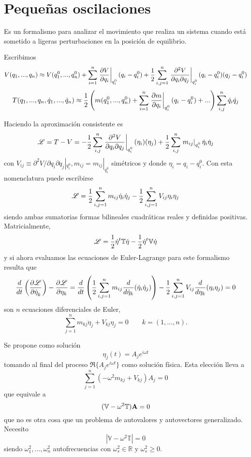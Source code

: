 \documentclass[10pt,oneside]{CBFT_book}
\begin{document}
\chapter{Pequeñas oscilaciones}

Es un formalismo para analizar el movimiento que realiza un sistema cuando está sometido a
ligeras perturbaciones en la posición de equilibrio.

Escribimos
\[
	V(q_1,...,q_n) \approx V(q_1^0,...,q_n^0) + \sum_{i=1}^n \left. \dpar{V}{q_i} \right|_{q_i^0} (q_i - q_i^0)
		+ \frac{1}{2} \sum_{i,j=1}^n \left. \dparcru{V}{q_j}{q_i}\right|_{q_i^0}(q_i -q_i^0)(q_j -q_i^0)
\]
\[
	T(q_1,...,q_n,\dot{q}_1,...,\dot{q}_n) \approx \frac{1}{2} \left( m(q_1^0,...,q_n^0) + \sum_{i=1}^n 
				\left. \dpar{m}{q_i} \right|_{q_i^0} (q_i - q_i^0) + ... \right) \sum_{i,j}^n \dot{q}_i\dot{q}_j
\]

Haciendo la aproximación consistente es
\[
	\Lag = T - V = - \frac{1}{2} \sum_{i,j}^n \left. \dparcru{V}{q_j}{q_i}\right|_{q_i^0}(\eta_i)(\eta_j) +
		\frac{1}{2} \sum_{i,j}^n \left. m_{ij}\right|_{q_i^0} \dot{\eta}_i \dot{\eta}_j
\]
con $V_{ij} \equiv \partial^2 V/ \partial q_i \partial q_j |_{q_i^0} , m_{ij} = m_{ij}|_{q_i^0}$ simétricos 
y donde $\eta_i = q_i - q_i^0$. Con esta nomenclatura puede escribirse
\[
	\Lag = \frac{1}{2} \sum_{i,j=1}^n m_{ij} \dot{\eta}_i \dot{\eta}_j - \frac{1}{2} \sum_{i,j=1}^n V_{ij} \eta_i \eta_j
\]
siendo ambas sumatorias formas bilineales cuadráticas reales y definidas positivas. Matricialmente,
\[
	\Lag = \frac{1}{2} \dot{\vb{\eta}}^t \mathbb{T} \dot{\vb{\eta}} - \frac{1}{2} \dot{\vb{\eta}}^t \mathbb{V} \dot{\vb{\eta}}
\]
y si ahora evaluamos las ecuaciones de Euler-Lagrange para este formalismo resulta que 
\[
	\frac{d}{dt}\left( \dpar{\Lag}{\dot{\eta}_k} \right) - \dpar{\Lag}{\eta_k} = 
		\frac{d}{dt} \left( \frac{1}{2} \sum_{i,j=1}^n m_{ij} \frac{d}{d\dot{\eta}_k}(\dot{\eta}_i \dot{\eta}_j) \right) - 
		\frac{1}{2} \sum_{i,j=1}^n V_{ij} \frac{d}{d\eta_k} (\eta_i \eta_j) = 0
\]
son $n$ ecuaciones diferenciales de Euler, 
\[
	\sum_{j=1}^n m_{kj} \ddot{\eta}_j + V_{kj} \eta_j = 0 \qquad k=(1,...,n).
\]

Se propone como solución 
\[
	\eta_j(t)  = A_j e^{i\omega t}
\]
tomando al final del proceso $\Re\{A_j e^{i\omega t}\}$ como solución física. Esta elección lleva a
\[
	\sum_{j=1}^n ( - \omega^2 m_{kj} + V_{kj} ) A_j = 0
\]
que equivale a
\[
	(\mathbb{V} -\omega^2\mathbb{T})\vb{A} = 0
\]
que no es otra cosa que un problema de autovalores y autovectores generalizado. Necesito
\[
	\left| \mathbb{V} -\omega^2\mathbb{T} \right| = 0
\]
siendo $\omega^2_1, ...,\omega^2_n$ autofrecuencias con $\omega^2_s \in \mathbb{R}$ y $\omega^2_s \geq 0$.
\end{document}
